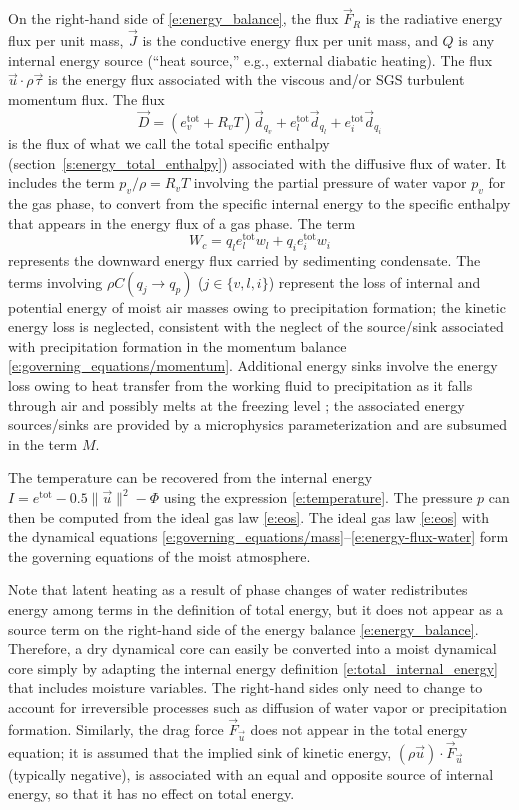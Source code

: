 \documentclass{report}
\begin{document}
On the right-hand side of \eqref{e:energy_balance}, the flux $\vec{F}_R$ is the radiative energy flux per unit mass, $\vec{J}$ is the conductive energy flux per unit mass, and $Q$ is any internal energy source (``heat source,'' e.g., external diabatic heating). The flux $\vec{u} \cdot \rho\vec{\tau}$ is the energy flux associated with the viscous and/or SGS turbulent momentum flux. The flux 
\begin{equation}\label{e:energy-flux-water}
\vec{D} = (e_v^{\mathrm{tot}} + R_v T) \vec{d}_{q_v} + e_l^{\mathrm{tot}} \vec{d}_{q_l} +  e_i^{\mathrm{tot}} \vec{d}_{q_i}
\end{equation}
is the flux of what we call the total specific enthalpy (section~\ref{s:energy_total_enthalpy}) associated with the diffusive flux of water. It includes the term $p_v/\rho = R_v T$ involving the partial pressure of water vapor $p_v$ for the gas phase, to convert from the specific internal energy to the specific enthalpy that appears in the energy flux of a gas phase. The term 
\begin{equation}
W_c = q_l e_l^{\mathrm{tot}} w_l + q_i e_i^{\mathrm{tot}} w_i
\end{equation}
represents the downward energy flux carried by sedimenting condensate. The terms involving $\rho C(q_j \rightarrow q_p)$ ($j \in \{ v, l, i \}$) represent the loss of internal and potential energy of moist air masses owing to precipitation formation; the kinetic energy loss is neglected, consistent with the neglect of the source/sink associated with precipitation formation in the momentum balance \eqref{e:governing_equations/momentum}. Additional energy sinks involve the energy loss owing to heat transfer from the working fluid to precipitation as it falls through air and possibly melts at the freezing level \citep{Raymond13b}; the associated energy sources/sinks are provided by a microphysics parameterization and are subsumed in the term $M$. 

The temperature can be recovered from the internal energy $I = e^{\mathrm{tot}} - 0.5 \| \vec{u} \|^2 - \Phi$ using the expression \eqref{e:temperature}. The pressure $p$ can then be computed from the ideal gas law \eqref{e:eos}. The ideal gas law \eqref{e:eos} with the dynamical equations \eqref{e:governing_equations/mass}--\eqref{e:energy-flux-water} form the governing equations of the moist atmosphere.

Note that latent heating as a result of phase changes of water redistributes energy among terms in the definition of total energy, but it does not appear as a source term on the right-hand side of the energy balance \eqref{e:energy_balance}. Therefore, a dry dynamical core can easily be converted into a moist dynamical core simply by adapting the internal energy definition \eqref{e:total_internal_energy} that includes moisture variables. The right-hand sides only need to change to account for irreversible processes such as diffusion of water vapor or precipitation formation. Similarly, the drag force $\vec{F}_{\vec{u}}$ does not appear in the total energy equation; it is assumed that the implied sink of kinetic energy, $(\rho \vec{u})\cdot \vec{F}_{\vec{u}}$ (typically negative), is associated with an equal and opposite source of internal energy, so that it has no effect on total energy.
\end{document}

